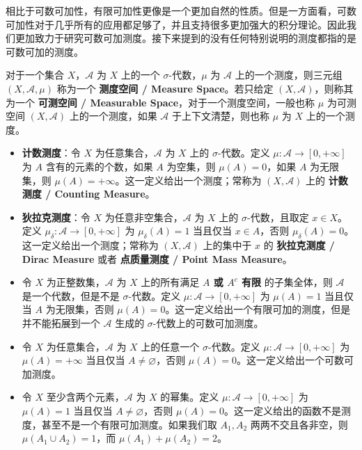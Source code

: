 \documentclass[11pt]{article}
\newcommand{\calA}{\mathcal{A}}
\newcommand{\diam}{\varnothing}
\begin{document}
相比于可数可加性，有限可加性更像是一个更加自然的性质。但是一方面看，可数可加性对于几乎所有的应用都足够了，并且支持很多更加强大的积分理论。因此我们更加致力于研究可数可加测度。接下来提到的没有任何特别说明的测度都指的是可数可加的测度。

\begin{definition}
    对于一个集合 $X$，$\calA$ 为 $X$ 上的一个 $\sigma$-代数，$\mu$ 为 $\calA$ 上的一个测度，则三元组 $(X,\calA,\mu)$ 称为一个 {\normalfont\bfseries 测度空间 / Measure Space}。若只给定 $(X,\calA)$，则称其为一个 {\normalfont\bfseries 可测空间 / Measurable Space}，对于一个测度空间，一般也称 $\mu$ 为可测空间 $(X,\calA)$ 上的一个测度，如果 $\calA$ 于上下文清楚，则也称 $\mu$ 为 $X$ 上的一个测度。
\end{definition}

\begin{example}
    \begin{itemize}
        \item {\normalfont\bfseries 计数测度}：令 $X$ 为任意集合，$\calA$ 为 $X$ 上的 $\sigma$-代数。定义 $\mu:\calA \to [0,+\infty]$ 为 $A$ 含有的元素的个数，如果 $A$ 为空集，则 $\mu(A)=0$，如果 $A$ 为无限集，则 $\mu(A)=+\infty$。这一定义给出一个测度；常称为 $(X,\calA)$ 上的 {\normalfont\bfseries 计数测度 / Counting Measure}。
        \item {\normalfont\bfseries 狄拉克测度}：令 $X$ 为任意非空集合，$\calA$ 为 $X$ 上的 $\sigma$-代数，且取定 $x \in X$。定义 $\mu_\delta:\calA \to [0,+\infty]$ 为 $\mu_\delta(A)=1$ 当且仅当 $x \in A$，否则 $\mu_\delta(A)=0$。这一定义给出一个测度；常称为 $(X,\calA)$ 上的集中于 $x$ 的 {\normalfont\bfseries 狄拉克测度 / Dirac Measure} 或者 {\normalfont\bfseries 点质量测度 / Point Mass Measure}。
        \item 令 $X$ 为正整数集，$\calA$ 为 $X$ 上的所有满足 {\normalfont\bfseries $A$ 或 $A^c$ 有限} 的子集全体，则 $\calA$ 是一个代数，但是不是 $\sigma$-代数。定义 $\mu:\calA \to [0,+\infty]$ 为 $\mu(A)=1$ 当且仅当 $A$ 为无限集，否则 $\mu(A)=0$。这一定义给出一个有限可加的测度，但是并不能拓展到一个 $\calA$ 生成的 $\sigma$-代数上的可数可加测度。
        \item 令 $X$ 为任意集合，$\calA$ 为 $X$ 上的任意一个 $\sigma$-代数。定义 $\mu:\calA \to [0,+\infty]$ 为 $\mu(A)=+\infty$ 当且仅当 $A \ne \diam$，否则 $\mu(A)=0$。这一定义给出一个可数可加测度。
        \item 令 $X$ 至少含两个元素，$\calA$ 为 $X$ 的幂集。定义 $\mu:\calA \to [0,+\infty]$ 为 $\mu(A)=1$ 当且仅当 $A \ne \diam$，否则 $\mu(A)=0$。这一定义给出的函数不是测度，甚至不是一个有限可加测度。如果我们取 $A_1,A_2$ 两两不交且各非空，则 $\mu(A_1 \cup A_2)=1$，而 $\mu(A_1)+\mu(A_2)=2$。
    \end{itemize}
\end{example}
\end{document}
